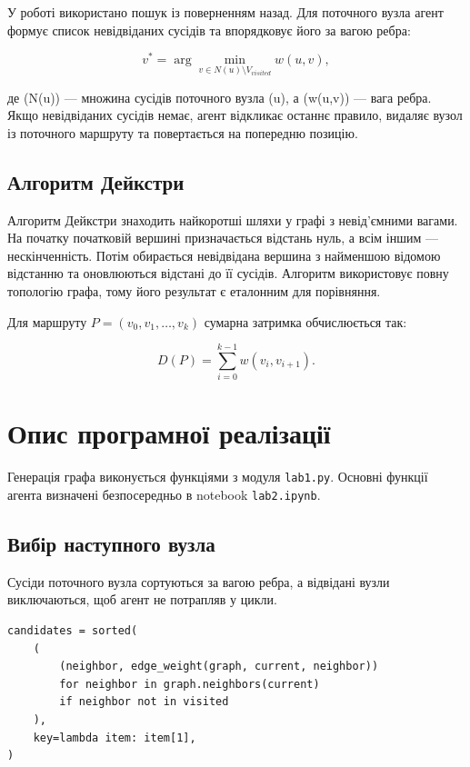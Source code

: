 \documentclass[12pt,a4paper]{article}
\begin{document}
У роботі використано пошук із поверненням назад. Для поточного вузла агент
формує список невідвіданих сусідів та впорядковує його за вагою ребра:

\begin{equation}
  v^* = \arg\min_{v\in N(u)\setminus V_{visited}} w(u,v),
\end{equation}

де (N(u)) --- множина сусідів поточного вузла (u), а (w(u,v)) --- вага
ребра. Якщо невідвіданих сусідів немає, агент відкликає останнє правило,
видаляє вузол із поточного маршруту та повертається на попередню позицію.

\subsection{Алгоритм Дейкстри}

Алгоритм Дейкстри знаходить найкоротші шляхи у графі з невід'ємними вагами.
На початку початковій вершині призначається відстань нуль, а всім іншим ---
нескінченність. Потім обирається невідвідана вершина з найменшою відомою
відстанню та оновлюються відстані до її сусідів. Алгоритм використовує повну
топологію графа, тому його результат є еталонним для порівняння.

Для маршруту $P=(v_0,v_1,\ldots,v_k)$ сумарна затримка обчислюється так:

\begin{equation}
  D(P)=\sum_{i=0}^{k-1}w(v_i,v_{i+1}).
\end{equation}

\section{Опис програмної реалізації}

Генерація графа виконується функціями з модуля \texttt{lab1.py}. Основні
функції агента визначені безпосередньо в notebook \texttt{lab2.ipynb}.

\subsection{Вибір наступного вузла}

Сусіди поточного вузла сортуються за вагою ребра, а відвідані вузли
виключаються, щоб агент не потрапляв у цикли.

\begin{listing}[H]
\begin{verbatim}
candidates = sorted(
    (
        (neighbor, edge_weight(graph, current, neighbor))
        for neighbor in graph.neighbors(current)
        if neighbor not in visited
    ),
    key=lambda item: item[1],
)
\end{verbatim}
\caption{Формування впорядкованого списку локальних варіантів}
\end{listing}
\end{document}
